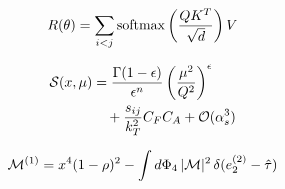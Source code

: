 \begin{equation}
  R(\theta) = \sum_{i<j} \mathrm{softmax}\left(\frac{Q K^T}{\sqrt{d}}\right) V
  \label{eq:1}
\end{equation}

\begin{align}
  \mathcal{S}(x, \mu) &= \frac{\Gamma(1-\epsilon)}{\epsilon^{n}} \left(\frac{\mu^2}{Q^2}\right)^{\epsilon} \nonumber \\
  &\quad + \frac{s_{ij}}{k_T^2} C_F C_A + \mathcal{O}(\alpha_s^3) \label{eq:3}
\end{align}

\begin{equation}
  \mathcal{M}^{(1)} = {x}^{4} (1 - \rho)^{2} - \int d\Phi_{4} \, |\mathcal{M}|^2 \, \delta(e_2^{(2)} - \hat{\tau})
  \label{eq:5}
\end{equation}

